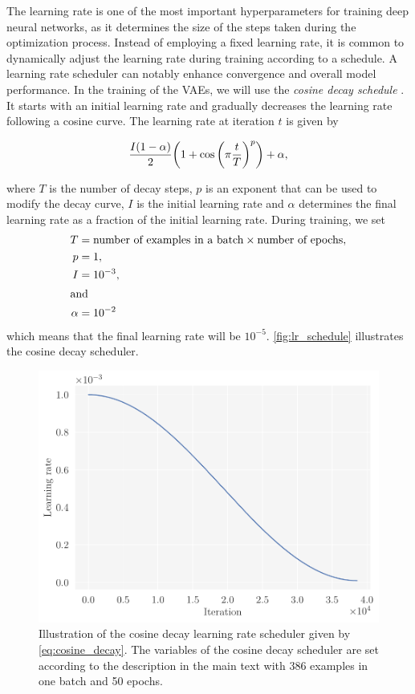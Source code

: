 The learning rate is one of the most important hyperparameters for training deep neural networks, as it determines the size of the steps taken during the optimization process. Instead of employing a fixed learning rate, it is common to dynamically adjust the learning rate during training according to a schedule. A learning rate scheduler can notably enhance convergence and overall model performance. In the training of the VAEs, we will use the \textit{cosine decay schedule} \citep{cosine_decay}. It starts with an initial learning rate and gradually decreases the learning rate following a cosine curve. The learning rate at iteration $t$ is given by

\begin{equation}\label{eq:cosine_decay}
    \frac{I \qty(1 - \alpha)}{2} \qty(1 + \cos \qty(\pi \frac{t}{T})^p) + \alpha,
\end{equation}

where $T$ is the number of decay steps, $p$ is an exponent that can be used to modify the decay curve, $I$ is the initial learning rate and $\alpha$ determines the final learning rate as a fraction of the initial learning rate. During training, we set 
\begin{align*}
    T &= \text{number of examples in a batch} \times \text{number of epochs}, \\
    p &= 1, \\
    I &= 10^{-3}, \\
    \intertext{and}
    \alpha &= 10^{-2}
\end{align*}
which means that the final learning rate will be $10^{-5}$. \autoref{fig:lr_schedule} illustrates the cosine decay scheduler.

\begin{figure}[!htb]
\begin{center}\includegraphics[scale=0.7]{latex/figures/lr_schedule.pdf}
\end{center}
\caption{Illustration of the cosine decay learning rate scheduler given by \autoref{eq:cosine_decay}. The variables of the cosine decay scheduler are set according to the description in the main text with 386 examples in one batch and 50 epochs.}
\label{fig:lr_schedule}
\end{figure}


